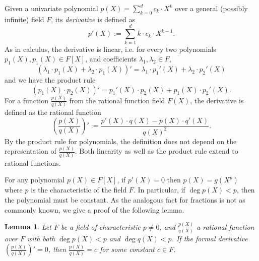 \documentclass[11pt]{article}
\newtheorem{lem}[]{Lemma}
\theoremstyle{definition}
\theoremstyle{remark}
\begin{document}
Given a univariate polynomial $p(X) =\sum_{k=0}^{d} c_k\cdot X^k$ over a general (possibly infinite) field $F$, its \textit{derivative} is defined as 
\begin{equation}
\label{e:DerivativePoly}
p'(X) := \sum_{k=1}^{d} k \cdot c_k \cdot X^{k-1}.
\end{equation}
As in calculus, the derivative is linear, i.e. for every two polynomials $p_1(X), p_1(X)\in F[X]$, and coefficients $\lambda_1,\lambda_2\in F$,
\begin{equation*}
(\lambda_1 \cdot p_1(X) + \lambda_2 \cdot p_1(X))' = \lambda_1\cdot p_1'(X) + \lambda_2\cdot p_2'(X)
\end{equation*}
 and we have the product rule
\begin{equation*}
(p_1(X)\cdot p_2(X))' = p_1'(X)\cdot p_2(X) + p_1(X)\cdot p_2'(X).
\end{equation*}
For a function $\frac{p(X)}{q(X)}$ from the rational function field $F(X)$, the derivative is defined as the rational function
\begin{equation}
\label{e:DerivativeQuotient}
\left(\frac{p(X)}{q(X)}\right)' := \frac{p'(X)\cdot q(X) - p(X)\cdot q'(X)}{q(X)^2}.
\end{equation}
By the product rule for polynomials, the definition does not depend on the representation of $\frac{p(X)}{q(X)}$.
Both linearity as well as the product rule extend to rational functions. 

For any polynomial $p(X)\in F[X]$, if $p'(X)=0$ then $p(X)= g(X^p)$ where $p$ is the characteristic of the field $F$.
In particular, if $\deg p(X) < p$, then the polynomial must be constant.
As the analogous fact for fractions is not as commonly known, we give a proof of the following lemma.

\begin{lem}
\label{lem:DerivativeFraction}
Let  $F$ be a field of characteristic $p\neq 0$, and $\frac{p(X)}{q(X)}$ a rational function over $F$ with both  $\deg p(X) < p$ and $\deg q(X) < p$.
If the formal derivative $\left(\frac{p(X)}{q(X)}\right)' = 0$, then $\frac{p(X)}{q(X)} = c$ for some constant $c\in F$.
\end{lem}
\end{document}
